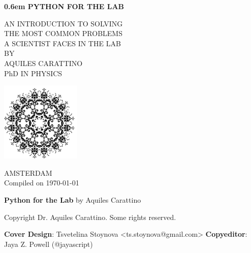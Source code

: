 \clearpage
\newcommand\nbvspace[1][3]{\vspace*{\stretch{#1}}}
\newcommand\nbstretchyspace{\spaceskip0.5em plus 0.25em minus 0.25em}
\newcommand{\nbtitlestretch}{\spaceskip0.6em}
\pagestyle{empty}
\begin{center}
\bfseries
\nbvspace[1]
\Huge
{\nbtitlestretch\huge
PYTHON FOR THE LAB}

\nbvspace[1]
\normalsize

AN INTRODUCTION TO SOLVING\\
THE MOST COMMON PROBLEMS\\
A SCIENTIST FACES IN THE LAB \\

\nbvspace[1]
\small BY\\
\Large AQUILES CARATTINO\\[0.5em]
\footnotesize PhD IN PHYSICS

\nbvspace[2]

\includegraphics[width=1.5in]{./images/Floral-Silhouette-2.png}
\nbvspace[3]
\normalsize

AMSTERDAM\\
\large
\nbvspace[1]
Compiled on \today
\end{center}

\clearpage

\thispagestyle{empty}

\noindent\textbf{Python for the Lab}\newline
by Aquiles Carattino

\bigskip

\noindent Copyright  Dr. Aquiles Carattino. Some rights reserved.

\vspace{1.5cm}

\noindent\textbf{Cover Design}: Tsvetelina Stoynova <ts.stoynova@gmail.com> \newline
\textbf{Copyeditor}: Jaya Z. Powell (@jayascript)

